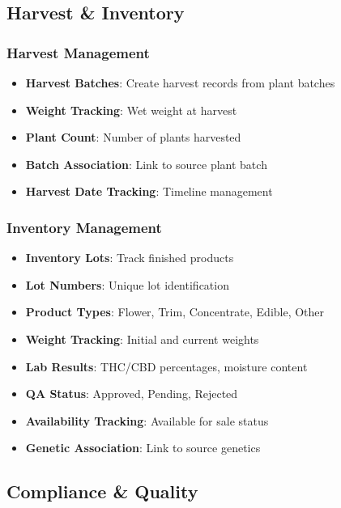 \documentclass[11pt,a4paper]{article}
\begin{document}
\subsection{Harvest \& Inventory}

\subsubsection{Harvest Management}
\begin{itemize}
    \item \textbf{Harvest Batches}: Create harvest records from plant batches
    \item \textbf{Weight Tracking}: Wet weight at harvest
    \item \textbf{Plant Count}: Number of plants harvested
    \item \textbf{Batch Association}: Link to source plant batch
    \item \textbf{Harvest Date Tracking}: Timeline management
\end{itemize}

\subsubsection{Inventory Management}
\begin{itemize}
    \item \textbf{Inventory Lots}: Track finished products
    \item \textbf{Lot Numbers}: Unique lot identification
    \item \textbf{Product Types}: Flower, Trim, Concentrate, Edible, Other
    \item \textbf{Weight Tracking}: Initial and current weights
    \item \textbf{Lab Results}: THC/CBD percentages, moisture content
    \item \textbf{QA Status}: Approved, Pending, Rejected
    \item \textbf{Availability Tracking}: Available for sale status
    \item \textbf{Genetic Association}: Link to source genetics
\end{itemize}

\subsection{Compliance \& Quality}
\end{document}
